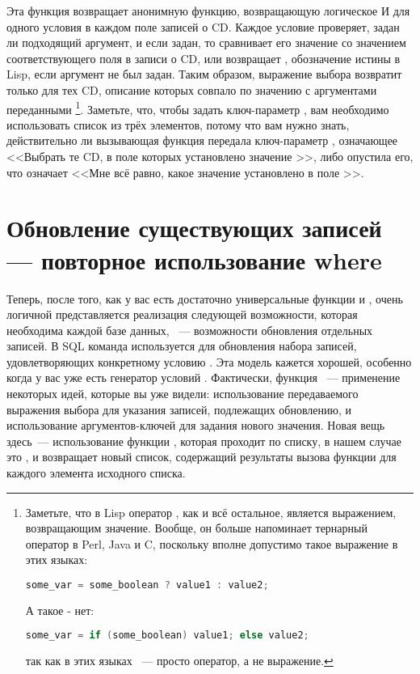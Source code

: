 Эта функция возвращает анонимную функцию, возвращающую логическое И для одного условия в
каждом поле записей о CD. Каждое условие проверяет, задан ли подходящий аргумент, и если
задан, то сравнивает его значение со значением соответствующего поля в записи о CD, или
возвращает , обозначение истины в Lisp, если аргумент не был задан. Таким образом,
выражение выбора возвратит  только для тех CD, описание которых совпало по
значению с аргументами переданными \footnote{Заметьте, что в Lisp оператор
  , как и всё остальное, является выражением, возвращающим значение. Вообще, он
  больше напоминает тернарный оператор  в Perl, Java и C, поскольку вполне
  допустимо такое выражение в этих языках:

\begin{lstlisting}[language=c]
some_var = some_boolean ? value1 : value2;
\end{lstlisting}

А такое - нет:
\begin{lstlisting}[language=C]
some_var = if (some_boolean) value1; else value2;
\end{lstlisting}

так как в этих языках ~--- просто оператор, а не выражение.}. Заметьте, что,
чтобы задать ключ-параметр , вам необходимо использовать список из трёх
элементов, потому что вам нужно знать, действительно ли вызывающая функция передала
ключ-параметр , означающее <<Выбрать те CD, в поле  которых
установлено значение >>, либо опустила его, что означает <<Мне всё равно, какое
значение установлено в поле >>.

\section{Обновление существующих записей — повторное использование where}

Теперь, после того, как у вас есть достаточно универсальные функции  и
, очень логичной представляется реализация следующей возможности, которая
необходима каждой базе данных, ~--- возможности обновления отдельных записей. В SQL команда
 используется для обновления набора записей, удовлетворяющих конкретному
условию . Эта модель кажется хорошей, особенно когда у вас уже есть генератор
условий . Фактически, функция ~--- применение некоторых идей,
которые вы уже видели: использование передаваемого выражения выбора для указания записей,
подлежащих обновлению, и использование аргументов-ключей для задания нового
значения. Новая вещь здесь~--- использование функции , которая проходит по
списку, в нашем случае это , и возвращает новый список, содержащий результаты
вызова функции для каждого элемента исходного списка.

